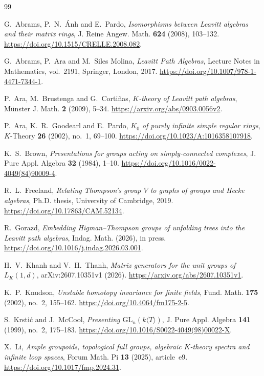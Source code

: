 \documentclass[11pt]{amsart}
\theoremstyle{definition}
\theoremstyle{remark}
\numberwithin{equation}{section}
\begin{document}
\begin{thebibliography}{99}

G.~Abrams, P.~N.~\'{A}nh and E.~Pardo, \emph{Isomorphisms between Leavitt algebras and their matrix rings}, J. Reine Angew. Math. \textbf{624} (2008), 103--132. \url{https://doi.org/10.1515/CRELLE.2008.082}.

G.~Abrams, P.~Ara and M.~Siles Molina, \emph{Leavitt Path Algebras}, Lecture Notes in Mathematics, vol.~2191, Springer, London, 2017. \url{https://doi.org/10.1007/978-1-4471-7344-1}.

P.~Ara, M.~Brustenga and G.~Corti\~nas, \emph{$K$-theory of Leavitt path algebras}, M\"unster J. Math. \textbf{2} (2009), 5--34. \url{https://arxiv.org/abs/0903.0056v2}.

P.~Ara, K.~R.~Goodearl and E.~Pardo, \emph{$K_0$ of purely infinite simple regular rings}, $K$-Theory \textbf{26} (2002), no.~1, 69--100. \url{https://doi.org/10.1023/A:1016358107918}.

K.~S.~Brown, \emph{Presentations for groups acting on simply-connected complexes}, J. Pure Appl. Algebra \textbf{32} (1984), 1--10. \url{https://doi.org/10.1016/0022-4049(84)90009-4}.

R.~L.~Freeland, \emph{Relating Thompson's group $V$ to graphs of groups and Hecke algebras}, Ph.D. thesis, University of Cambridge, 2019. \url{https://doi.org/10.17863/CAM.52134}.

R.~Gorazd, \emph{Embedding Higman--Thompson groups of unfolding trees into the Leavitt path algebras}, Indag. Math. (2026), in press. \url{https://doi.org/10.1016/j.indag.2026.03.001}.

H.~V.~Khanh and V.~H.~Thanh, \emph{Matrix generators for the unit groups of $L_K(1,d)$}, arXiv:2607.10351v1 (2026). \url{https://arxiv.org/abs/2607.10351v1}.

K.~P.~Knudson, \emph{Unstable homotopy invariance for finite fields}, Fund. Math. \textbf{175} (2002), no.~2, 155--162. \url{https://doi.org/10.4064/fm175-2-5}.

S.~Krsti\'c and J.~McCool, \emph{Presenting $\mathrm{GL}_n(k\langle T\rangle)$}, J. Pure Appl. Algebra \textbf{141} (1999), no.~2, 175--183. \url{https://doi.org/10.1016/S0022-4049(98)00022-X}.

X.~Li, \emph{Ample groupoids, topological full groups, algebraic $K$-theory spectra and infinite loop spaces}, Forum Math. Pi \textbf{13} (2025), article~e9. \url{https://doi.org/10.1017/fmp.2024.31}.


\end{thebibliography}
\end{document}
